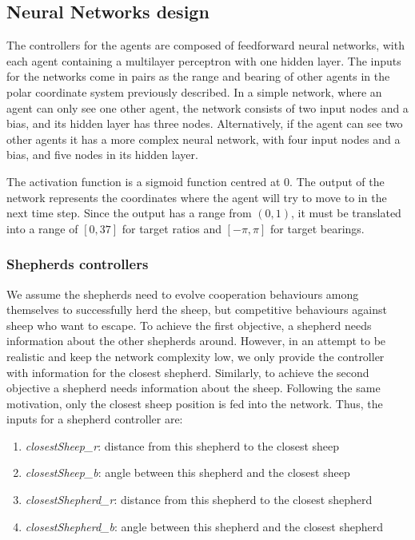 \documentclass[conference]{IEEEtran}
\begin{document}
\subsection{Neural Networks design}
\label{sec:NN_design}
The controllers for the agents are composed of feedforward neural networks, with each agent containing a multilayer perceptron with one hidden layer. 
The inputs for the networks come in pairs as the range and bearing of other agents in the polar coordinate system previously described. 
In a simple network, where an agent can only see one other agent, the network consists of two input nodes and a bias, and its hidden layer has three nodes. 
Alternatively, if the agent can see two other agents it has a more complex neural network, with four input nodes and a bias, and five nodes in its hidden layer. 

The activation function is a sigmoid function centred at 0. 
The output of the network represents the coordinates where the agent will try to move to in the next time step. 
Since the output has a range from $(0, 1)$, it must be translated into a range of $[0, 37]$ for target ratios and $[-\pi, \pi]$ for target bearings. 
 
\vspace{1em}
\subsubsection{Shepherds controllers}
We assume the shepherds need to evolve cooperation behaviours among themselves to successfully herd the sheep, but competitive behaviours against sheep who want to escape. To achieve the first objective, a shepherd needs information about the other shepherds around. However, in an attempt to be realistic and keep the network complexity low, we only provide the controller with information for the closest shepherd. Similarly, to achieve the second objective a shepherd needs information about the sheep. Following the same motivation, only the closest sheep position is fed into the network. Thus, the inputs for a shepherd controller are: 

\begin{enumerate}
	\item \textit{closestSheep\_r}: distance from this shepherd to the closest sheep
	\item \textit{closestSheep\_b}: angle between this shepherd and the closest sheep 
	\item \textit{closestShepherd\_r}: distance from this shepherd to the closest shepherd
	\item \textit{closestShepherd\_b}: angle between this shepherd and the closest shepherd
\end{enumerate}
\end{document}
